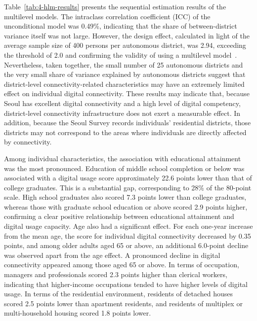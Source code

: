 Table~\ref{tab:4-hlm-results} presents the sequential estimation results of the multilevel models. The intraclass correlation coefficient (ICC) of the unconditional model was 0.49\%, indicating that the share of between-district variance itself was not large. However, the design effect, calculated in light of the average sample size of 400 persons per autonomous district, was 2.94, exceeding the threshold of 2.0 and confirming the validity of using a multilevel model~\citep{HoxEtAl2018}. Nevertheless, taken together, the small number of 25 autonomous districts and the very small share of variance explained by autonomous districts suggest that district-level connectivity-related characteristics may have an extremely limited effect on individual digital connectivity. These results may indicate that, because Seoul has excellent digital connectivity and a high level of digital competency, district-level connectivity infrastructure does not exert a measurable effect. In addition, because the Seoul Survey records individuals' residential districts, those districts may not correspond to the areas where individuals are directly affected by connectivity.

Among individual characteristics, the association with educational attainment was the most pronounced. Education of middle school completion or below was associated with a digital usage score approximately 22.6 points lower than that of college graduates. This is a substantial gap, corresponding to 28\% of the 80-point scale. High school graduates also scored 7.3 points lower than college graduates, whereas those with graduate school education or above scored 2.9 points higher, confirming a clear positive relationship between educational attainment and digital usage capacity. Age also had a significant effect. For each one-year increase from the mean age, the score for individual digital connectivity decreased by 0.35 points, and among older adults aged 65 or above, an additional 6.0-point decline was observed apart from the age effect. A pronounced decline in digital connectivity appeared among those aged 65 or above. In terms of occupation, managers and professionals scored 2.3 points higher than clerical workers, indicating that higher-income occupations tended to have higher levels of digital usage. In terms of the residential environment, residents of detached houses scored 2.5 points lower than apartment residents, and residents of multiplex or multi-household housing scored 1.8 points lower.

